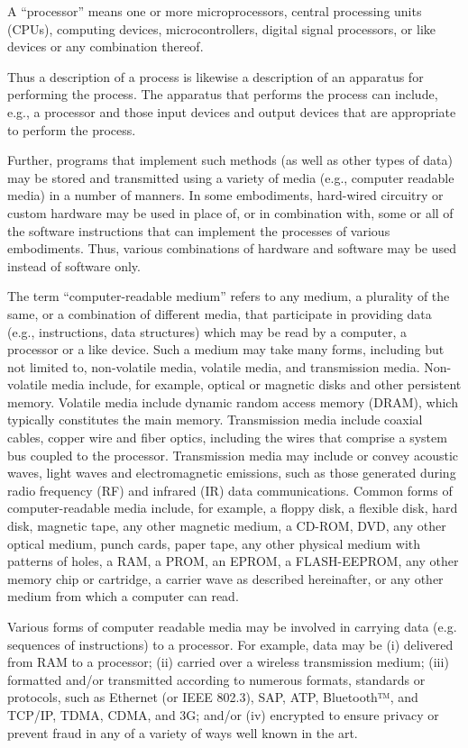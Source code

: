\documentclass[11pt,a4paper]{article}
\begin{document}
A “processor” means one or more microprocessors, central processing units (CPUs), computing devices, microcontrollers, digital signal processors, or like devices or any combination thereof.

Thus a description of a process is likewise a description of an apparatus for performing the process. The apparatus that performs the process can include, e.g., a processor and those input devices and output devices that are appropriate to perform the process.

Further, programs that implement such methods (as well as other types of data) may be stored and transmitted using a variety of media (e.g., computer readable media) in a number of manners. In some embodiments, hard-wired circuitry or custom hardware may be used in place of, or in combination with, some or all of the software instructions that can implement the processes of various embodiments. Thus, various combinations of hardware and software may be used instead of software only.

The term “computer-readable medium” refers to any medium, a plurality of the same, or a combination of different media, that participate in providing data (e.g., instructions, data structures) which may be read by a computer, a processor or a like device. Such a medium may take many forms, including but not limited to, non-volatile media, volatile media, and transmission media. Non-volatile media include, for example, optical or magnetic disks and other persistent memory. Volatile media include dynamic random access memory (DRAM), which typically constitutes the main memory. Transmission media include coaxial cables, copper wire and fiber optics, including the wires that comprise a system bus coupled to the processor. Transmission media may include or convey acoustic waves, light waves and electromagnetic emissions, such as those generated during radio frequency (RF) and infrared (IR) data communications. Common forms of computer-readable media include, for example, a floppy disk, a flexible disk, hard disk, magnetic tape, any other magnetic medium, a CD-ROM, DVD, any other optical medium, punch cards, paper tape, any other physical medium with patterns of holes, a RAM, a PROM, an EPROM, a FLASH-EEPROM, any other memory chip or cartridge, a carrier wave as described hereinafter, or any other medium from which a computer can read.

Various forms of computer readable media may be involved in carrying data (e.g. sequences of instructions) to a processor. For example, data may be (i) delivered from RAM to a processor; (ii) carried over a wireless transmission medium; (iii) formatted and/or transmitted according to numerous formats, standards or protocols, such as Ethernet (or IEEE 802.3), SAP, ATP, Bluetooth™, and TCP/IP, TDMA, CDMA, and 3G; and/or (iv) encrypted to ensure privacy or prevent fraud in any of a variety of ways well known in the art.
\end{document}
